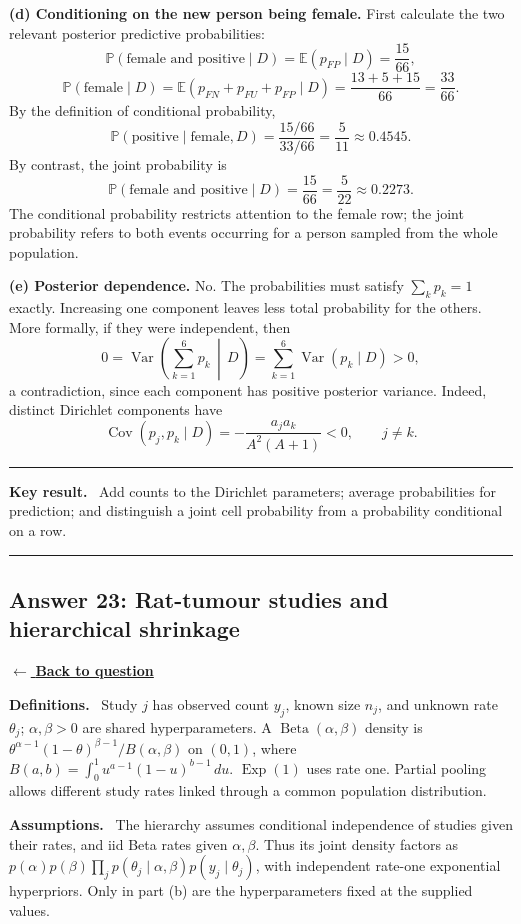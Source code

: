 \documentclass[11pt,a4paper]{article}
\newcommand{\given}{\mathrel{|}}
\newcommand{\E}{\mathbb{E}}
\newcommand{\answernav}[1]{%
  \label{answer:#1}%
  \noindent\hyperref[question:#1]{$\leftarrow$ \textbf{Back to question}}%
  \par\smallskip}
\newcommand{\studyheading}[1]{%
  \par\medskip\noindent\textcolor{statblue}{\textbf{#1.}}\ }
\newenvironment{keyresult}
  {\begin{center}\begin{minipage}{0.92\linewidth}\color{statblue}%
   \hrule\vspace{6pt}\textbf{Key result.}\ }
  {\vspace{6pt}\hrule\end{minipage}\end{center}}
\begin{document}
\textbf{(d) Conditioning on the new person being female.}
First calculate the two relevant posterior predictive probabilities:
\[
\mathbb{P}(\text{female and positive}\mid D)=\E(p_{FP}\mid D)=\frac{15}{66},
\]
\[
\mathbb{P}(\text{female}\mid D)
=\E(p_{FN}+p_{FU}+p_{FP}\mid D)
=\frac{13+5+15}{66}=\frac{33}{66}.
\]
By the definition of conditional probability,
\[
\boxed{
\mathbb{P}(\text{positive}\mid\text{female},D)
=\frac{15/66}{33/66}=\frac5{11}\approx0.4545.
}
\]
By contrast, the joint probability is
\[
\boxed{\mathbb{P}(\text{female and positive}\mid D)
=\frac{15}{66}=\frac5{22}\approx0.2273.}
\]
The conditional probability restricts attention to the female row; the joint
probability refers to both events occurring for a person sampled from the
whole population.

\textbf{(e) Posterior dependence.}
No. The probabilities must satisfy $\sum_k p_k=1$ exactly. Increasing one
component leaves less total probability for the others. More formally, if
they were independent, then
\[
0=\operatorname{Var}\!\left(\sum_{k=1}^{6}p_k\,\middle|\,D\right)
=\sum_{k=1}^{6}\operatorname{Var}(p_k\mid D)>0,
\]
a contradiction, since each component has positive posterior variance.
Indeed, distinct Dirichlet components have
\[
\operatorname{Cov}(p_j,p_k\mid D)
=-\frac{a_ja_k}{A^2(A+1)}<0,\qquad j\ne k.
\]

\begin{keyresult}
Add counts to the Dirichlet parameters; average probabilities for prediction;
and distinguish a joint cell probability from a probability conditional on a row.
\end{keyresult}

\clearpage

\subsection{Answer 23: Rat-tumour studies and hierarchical shrinkage}
\answernav{23}

\studyheading{Definitions}
Study $j$ has observed count $y_j$, known size $n_j$, and unknown rate $\theta_j$; $\alpha,\beta>0$ are shared hyperparameters.
A $\operatorname{Beta}(\alpha,\beta)$ density is
$\theta^{\alpha-1}(1-\theta)^{\beta-1}/B(\alpha,\beta)$ on $(0,1)$, where $B(a,b)=\int_0^1u^{a-1}(1-u)^{b-1}\,du$.
$\operatorname{Exp}(1)$ uses rate one.
Partial pooling allows different study rates linked through a common population distribution.

\studyheading{Assumptions}
The hierarchy assumes conditional independence of studies given their rates, and iid Beta rates given $\alpha,\beta$.
Thus its joint density factors as
$p(\alpha)p(\beta)\prod_jp(\theta_j\given\alpha,\beta)p(y_j\given\theta_j)$,
with independent rate-one exponential hyperpriors.
Only in part (b) are the hyperparameters fixed at the supplied values.
\end{document}
